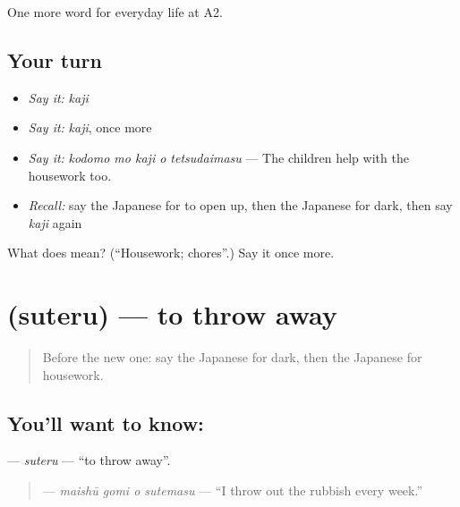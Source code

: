 \begin{grammarlens}[title={What you've built}]
One more word for everyday life at A2.
\end{grammarlens}

\subsection*{Your turn}
\begin{itemize}
\raggedright
  \item \emph{Say it:} \emph{kaji}
  \item \emph{Say it:} \emph{kaji}, once more
  \item \emph{Say it:} \emph{kodomo mo kaji o tetsudaimasu} — The children help with the housework too.
  \item \emph{Recall:} say the Japanese for to open up, then the Japanese for dark, then say \emph{kaji} again
\end{itemize}

\begin{tcolorbox}[breakable,colback=teal!4,colframe=teal!35!black,title={Before you move on}]
What does  mean? (\textquotedblleft{}Housework; chores\textquotedblright{}.) Say it once more.
\end{tcolorbox}
\section[\texorpdfstring{\ja{すてる} (suteru)}{すてる (suteru)}]{ (suteru) — to throw away}

\label{lesson:JA-C159-suteru}



\begin{quote}
Before the new one: say the Japanese for dark, then the Japanese for housework.
\end{quote}

\subsection*{You'll want to know: }
\textbf{} — \emph{suteru} — \textquotedblleft{}to throw away\textquotedblright{}.

\begin{quote}
\textbf{  } — \emph{maishū gomi o sutemasu} — \textquotedblleft{}I throw out the rubbish every week.\textquotedblright{}
\end{quote}

